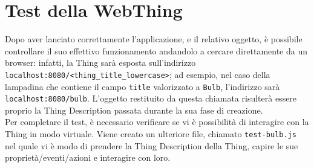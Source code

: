 \documentclass[12pt,a4paper,openright,oneside]{report}
\begin{document}
\section{Test della WebThing}
Dopo aver lanciato correttamente l'applicazione, e il relativo oggetto, è possibile controllare il suo effettivo funzionamento andandolo a cercare direttamente da un browser: infatti, la Thing sarà esposta sull'indirizzo \texttt{localhost:8080/<thing\_title\_lowercase>}; ad esempio, nel caso della lampadina che contiene il campo \texttt{title} valorizzato a \texttt{Bulb}, l'indirizzo sarà\\ \texttt{localhost:8080/bulb}. L'oggetto restituito da questa chiamata risulterà essere proprio la Thing Description passata durante la sua fase di creazione.\\

Per completare il test, è necessario verificare se vi è possibilità di interagire con la Thing in modo virtuale. Viene creato un ulteriore file, chiamato \texttt{test-bulb.js} nel quale vi è modo di prendere la Thing Description della Thing, capire le sue proprietà/eventi/azioni e interagire con loro.
\end{document}
